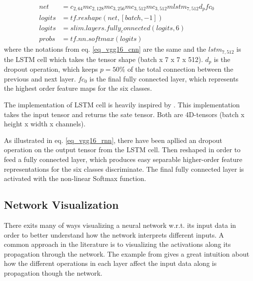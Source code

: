 \begin{equation}
\begin{aligned}
net &= c_{2,64}mc_{2,128}mc_{3,256}mc_{3,512}mc_{3,512}m lstm_{7,512} d_p fc_0\\
logits &=  tf.reshape(net, [batch, -1])\\
logits &= slim.layers.fully_connected(logits, 6) \\
probs &= tf.nn.softmax(logits)
\end{aligned}
\label{eq_vgg16_rnn}
\end{equation}
where the notations from eq. \ref{eq_vgg16_cnn} are the same and the $lstm_{7,512}$ is the LSTM cell   which takes the tensor shape (batch x 7 x 7 x 512). $d_p$ is the dropout operation, which keeps  $p = 50\%$ of the total connection between the previous and next layer. $fc_0$ is the final fully connected layer, which represents the highest order feature maps for the six classes.

The implementation of LSTM cell is heavily inspired by \cite{git_lstm}. This implementation takes the input tensor and returns the sate tensor. Both are 4D-tensors (batch x height x width x channels).

As illustrated in eq. \ref{eq_vgg16_rnn}, there have been apllied an dropout operation on the output tensor from the LSTM cell. Then reshaped in order to feed a fully connected layer, which produces easy separable higher-order feature representations for the six classes discriminate. The final fully connected layer is activated with the non-linear Softmax function.

\subsection{Network Visualization}

There exits many of ways visualizing a neural network w.r.t. its input data in order to better understand how the network interprets different inputs.  A common approach in the literature is to visualizing the activations along its propagation through the network. The example from \cite{stand_cnn} gives a great intuition about how the different operations in each layer affect the input data along is propagation though the network. 

